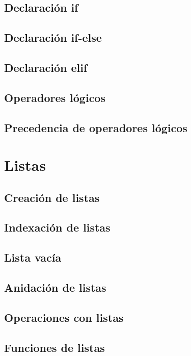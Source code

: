 \documentclass{article}
\begin{document}
\subsection{Declaración if}

\subsection{Declaración if-else}

\subsection{Declaración elif}

\subsection{Operadores lógicos}

\subsection{Precedencia de operadores lógicos}

\newpage\section{Listas}

\subsection{Creación de listas}

\subsection{Indexación de listas}

\subsection{Lista vacía}

\subsection{Anidación de listas}

\subsection{Operaciones con listas}

\subsection{Funciones de listas}
\end{document}
